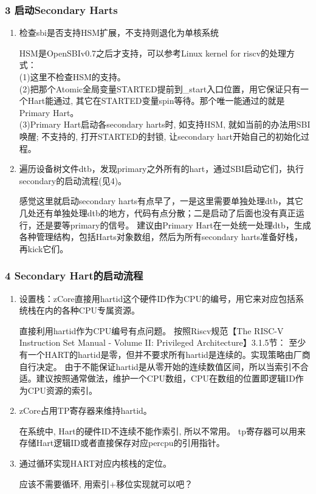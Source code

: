 \documentclass[
8pt, %
]{beamer}
\begin{document}
	\begin{frame}
		\frametitle{3 启动Secondary Harts}
		\begin{enumerate}
			\item 检查sbi是否支持HSM扩展，不支持则退化为单核系统
			\begin{block}{}
				HSM是OpenSBIv0.7之后才支持，可以参考Linux kernel for riscv的处理方式：\\
				(1)这里不检查HSM的支持。\\
				(2)把那个Atomic全局变量STARTED提前到\_start入口位置，用它保证只有一个Hart能通过,
                其它在STARTED变量spin等待。那个唯一能通过的就是Primary Hart。\\
				(3)Primary Hart启动各secondary harts时, 如支持HSM, 就如当前的办法用SBI唤醒;
                不支持的, 打开STARTED的封锁, 让secondary hart开始自己的初始化过程。
			\end{block}
			\item 遍历设备树文件dtb，发现primary之外所有的hart，通过SBI启动它们，执行secondary的启动流程(见4)。
			\begin{block}{}
				感觉这里就启动secondary harts有点早了，一是这里需要单独处理dtb，其它几处还有单独处理dtb的地方，代码有点分散；二是启动了后面也没有真正运行，还是要等primary的信号。
				建议由Primary Hart在一处统一处理dtb，生成各种管理结构，包括Harts对象数组，然后为所有secondary harts准备好栈，再kick它们。
			\end{block}
		\end{enumerate}
	\end{frame}

	\begin{frame}
		\frametitle{4 Secondary Hart的启动流程}
		\begin{enumerate}
			\item 设置栈：zCore直接用hartid这个硬件ID作为CPU的编号，用它来对应包括系统栈在内的各种CPU专属资源。
			\begin{block}{}
				直接利用hartid作为CPU编号有点问题。
				按照Riscv规范【The RISC-V Instruction Set Manual - Volume II: Privileged Architecture】3.1.5节：
				至少有一个HART的hartid是零，但并不要求所有hartid是连续的。实现策略由厂商自行决定。
				由于不能保证hartid是从零开始的连续数值区间，所以当索引不合适。建议按照通常做法，维护一个CPU数组，CPU在数组的位置即逻辑ID作为CPU资源的索引。
			\end{block}
			\item zCore占用TP寄存器来维持hartid。
			\begin{block}{}
				在系统中, Hart的硬件ID不连续不能作索引, 所以不常用。
                tp寄存器可以用来存储Hart逻辑ID或者直接保存对应percpu的引用指针。
			\end{block}
			\item 通过循环实现HART对应内核栈的定位。
			\begin{block}{}
				应该不需要循环, 用索引+移位实现就可以吧？
			\end{block}
		\end{enumerate}
	\end{frame}
\end{document}
